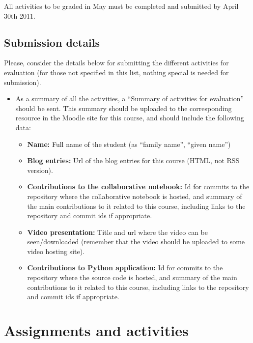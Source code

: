 \documentclass[a4paper]{article}
\begin{document}
All activities to be graded in May must be completed and submitted by April 30th 2011.

\subsection{Submission details}

Please, consider the details below for submitting the different activities for evaluation (for those not specified in this list, nothing special is needed for submission).

\begin{itemize}
\item As a summary of all the activities, a ``Summary of activities for evaluation'' should be sent. This summary should be uploaded to the corresponding resource in the Moodle site for this course, and should include the following data:
  \begin{itemize}
  \item \textbf{Name:} Full name of the student (as ``family name'', ``given name'')
  \item \textbf{Blog entries:} Url of the blog entries for this course (HTML, not RSS version).
  \item \textbf{Contributions to the collaborative notebook:} Id for commits to the repository where the collaborative notebook is hosted, and summary of the main contributions to it related to this course, including links to the repository and commit ids if appropriate.
  \item \textbf{Video presentation:} Title and url where the video can
    be seen/downloaded (remember that the video should be uploaded to
    some video hosting site).
  \item \textbf{Contributions to Python application:} Id for commits
    to the repository where the source code is hosted, and summary of the main contributions to it related to this course, including links to the repository and commit ids if appropriate.  \end{itemize}
\end{itemize}

\section{Assignments and activities}
\end{document}
